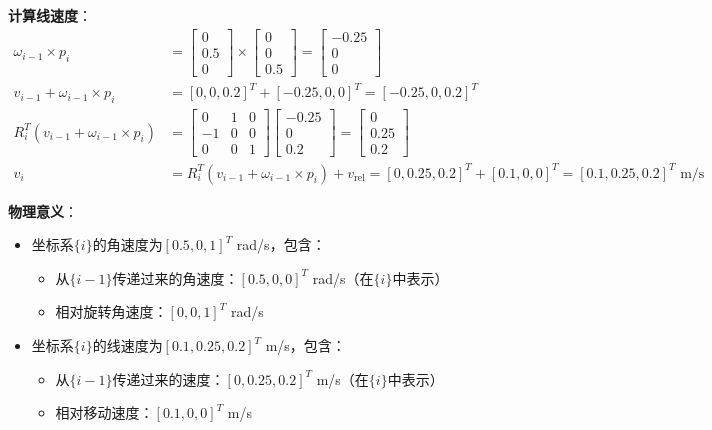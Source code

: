 \documentclass[12pt,a4paper]{article}
\begin{document}
\textbf{计算线速度}：
\begin{align}
\omega_{i-1} \times p_i &= \begin{bmatrix}
0 \\ 0.5 \\ 0
\end{bmatrix} \times \begin{bmatrix}
0 \\ 0 \\ 0.5
\end{bmatrix} = \begin{bmatrix}
-0.25 \\ 0 \\ 0
\end{bmatrix} \\
v_{i-1} + \omega_{i-1} \times p_i &= [0, 0, 0.2]^T + [-0.25, 0, 0]^T = [-0.25, 0, 0.2]^T \\
R_i^T (v_{i-1} + \omega_{i-1} \times p_i) &= \begin{bmatrix}
0 & 1 & 0 \\
-1 & 0 & 0 \\
0 & 0 & 1
\end{bmatrix} \begin{bmatrix}
-0.25 \\ 0 \\ 0.2
\end{bmatrix} = \begin{bmatrix}
0 \\ 0.25 \\ 0.2
\end{bmatrix} \\
v_i &= R_i^T (v_{i-1} + \omega_{i-1} \times p_i) + v_{\text{rel}} = [0, 0.25, 0.2]^T + [0.1, 0, 0]^T = [0.1, 0.25, 0.2]^T \text{ m/s}
\end{align}

\textbf{物理意义}：
\begin{itemize}
\item 坐标系$\{i\}$的角速度为$[0.5, 0, 1]^T$ rad/s，包含：
\begin{itemize}
\item 从$\{i-1\}$传递过来的角速度：$[0.5, 0, 0]^T$ rad/s（在$\{i\}$中表示）
\item 相对旋转角速度：$[0, 0, 1]^T$ rad/s
\end{itemize}
\item 坐标系$\{i\}$的线速度为$[0.1, 0.25, 0.2]^T$ m/s，包含：
\begin{itemize}
\item 从$\{i-1\}$传递过来的速度：$[0, 0.25, 0.2]^T$ m/s（在$\{i\}$中表示）
\item 相对移动速度：$[0.1, 0, 0]^T$ m/s
\end{itemize}
\end{itemize}
\end{document}
